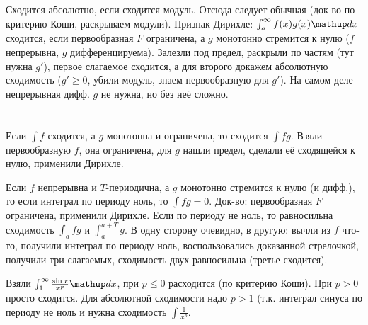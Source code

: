 \section{} %
Сходится абсолютно, если сходится модуль.
Отсюда следует обычная (док-во по критерию Коши, раскрываем модули).
Признак Дирихле: $\int_a^{\infty} f(x)g(x) \d x$ сходится, если первообразная $F$ ограничена, а $g$ монотонно стремится к нулю ($f$ непрерывна, $g$ дифференцируема).
Залезли под предел, раскрыли по частям (тут нужна $g'$), первое слагаемое сходится, а для второго докажем абсолютную сходимость ($g' \ge 0$, убили модуль, знаем первообразную для $g'$).
На самом деле непрерывная дифф. $g$ не нужна, но без неё сложно.

\section{} %
Если $\int f$ сходится, а $g$ монотонна и ограничена, то сходится $\int fg$.
Взяли первообразную $f$, она ограничена, для $g$ нашли предел, сделали её сходящейся к нулю, применили Дирихле.

Если $f$ непрерывна и $T$-периодична, а $g$ монотонно стремится к нулю (и дифф.), то если интеграл по периоду ноль, то $\int fg=0$.
Док-во: первообразная $F$ ограничена, применили Дирихле.
Если по периоду не ноль, то равносильна сходимость $\int_a fg$ и $\int_a^{a+T} g$. \TODO %
В одну сторону очевидно, в другую: вычли из $f$ что-то, получили интеграл по периоду ноль, воспользовались доказанной стрелочкой,
получили три слагаемых, сходимость двух равносильна (третье сходится).

Взяли $\int_1^{\infty} \frac{\sin x}{x^p} \d x$, при $p\le 0$ расходится (по критерию Коши).
При $p>0$ просто сходится. Для абсолютной сходимости надо $p>1$ (т.к. интеграл синуса по периоду не ноль и нужна сходимость $\int\frac{1}{x^p}$.
